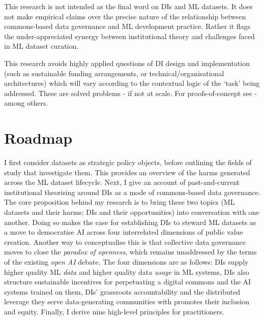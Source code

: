 This research is not intended as the final word on DIs and ML datasets. It does not make empirical claims over the precise nature of the relationship between commons-based data governance and ML development practice. Rather it flags the under-appreciated synergy between institutional theory and challenges faced in ML dataset curation. 

This research avoids highly applied questions of DI design and implementation (such as sustainable funding arrangements, or technical/organisational architectures) which will vary according to the contextual logic of the `task' being addressed. These are solved problems - if not at scale. For proofs-of-concept see \textcite{curry2022DataSpacesDesign, DesigningTrustworthyData, DataTrustsInitiative, commons-based_data_set_governance_for_ai} - among others. 

\section*{Roadmap}


I first consider datasets as strategic policy objects, before outlining the fields of study that investigate them. This provides an overview of the harms generated across the ML dataset lifecycle. Next, I give an account of past-and-current institutional theorising around DIs as a mode of commons-based data governance. The core proposition behind my research is to bring these two topics (ML datasets and their harms; DIs and their opportunities) into conversation with one another. Doing so makes the case for establishing DIs to steward ML datasets as a move to democratise AI across four interrelated dimensions of public value creation. Another way to conceptualise this is that collective data governance moves to close the \textit{paradox of openness}, which remains unaddressed by the terms of the existing \textit{open AI} debate. The four dimensions are as follows: DIs supply higher quality ML \textit{data} and higher quality data \textit{usage} in ML systems, DIs also structure sustainable incentives for perpetuating a digital commons and the AI systems trained on them, DIs' grassroots accountability and the distributed leverage they serve data-generating communities with promotes their inclusion and equity. Finally, I derive nine high-level principles for practitioners. 